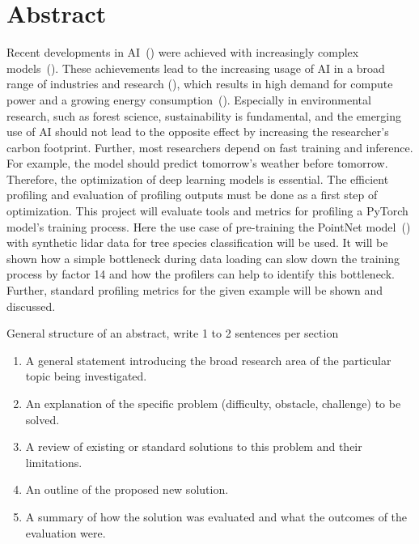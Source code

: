 \documentclass[12pt, a4paper, hidelinks]{article}
\begin{document}

\newpage
{}
\setcounter{page}{1}

\section*{Abstract}


Recent developments in \ac{AI}~(\cite{rombach_2022_high-resolution-image-synthesis-with-latent-diffusion-models, openai_2023_gpt4-4-technical-report}) were achieved with increasingly complex models~(\cite{schwartz_2019_greenai}). These achievements lead to the increasing usage of \ac{AI} in a broad range of industries and research (\cite{zhang_2022_ai-report}), which results in high demand for compute power and a growing energy consumption~(\cite{20220610_dodge_measuring-the-carbon-intensity-of-ai-in-cloud-instances}).
Especially in environmental research, such as forest science, sustainability is fundamental, and the emerging use of \ac{AI} should not lead to the opposite effect by increasing the researcher's carbon footprint. Further, most researchers depend on fast training and inference. For example, the model should predict tomorrow's weather before tomorrow.
Therefore, the optimization of deep learning models is essential. The efficient profiling and evaluation of profiling outputs must be done as a first step of optimization. This project will evaluate tools and metrics for profiling a PyTorch model's training process. Here the use case of pre-training the PointNet model~(\cite{2017_qi_pointnet}) with synthetic \ac{lidar} data for tree species classification will be used. It will be shown how a simple bottleneck during data loading can slow down the training process by factor 14 and how the profilers can help to identify this bottleneck. Further, standard profiling metrics for the given example will be shown and discussed.

\medskip
\iffalse
General structure of an abstract, write 1 to 2 sentences per section
\begin{enumerate}
\item  A general statement introducing the broad research area of the particular topic being investigated.
\item  An explanation of the specific problem (difficulty, obstacle, challenge) to be solved.
\item  A review of existing or standard solutions to this problem and their limitations.
\item  An outline of the proposed new solution.
\item  A summary of how the solution was evaluated and what the outcomes of the evaluation were.
\end{enumerate}
\end{document}
